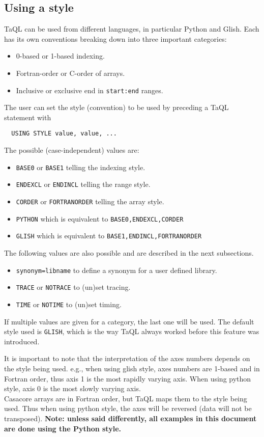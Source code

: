 \subsection{\label{TAQL:USINGSTYLE}Using a style}
TaQL can be used from different languages, in particular Python and
Glish. Each has its own conventions breaking down into three important
categories: 
\begin{itemize}
\item 0-based or 1-based indexing.
\item Fortran-order or C-order of arrays.
\item Inclusive or exclusive end in \texttt{start:end} ranges.
\end{itemize}
The user can set the style (convention) to be used by preceding a
TaQL statement with
\begin{verbatim}
  USING STYLE value, value, ...
\end{verbatim}
The possible (case-independent) values are:
\begin{itemize}
\item \texttt{BASE0} or \texttt{BASE1} telling the indexing style.
\item \texttt{ENDEXCL} or \texttt{ENDINCL} telling the range style.
\item \texttt{CORDER} or \texttt{FORTRANORDER} telling the array style.
\item \texttt{PYTHON} which is equivalent to \texttt{BASE0,ENDEXCL,CORDER}
\item \texttt{GLISH} which is equivalent to \texttt{BASE1,ENDINCL,FORTRANORDER}
\end{itemize}
The following values are also possible and are described in the next subsections.
\begin{itemize}
\item \texttt{synonym=libname} to define a synonym for a user defined
  library.
\item \texttt{TRACE} or \texttt{NOTRACE} to (un)set tracing.
\item \texttt{TIME} or \texttt{NOTIME} to (un)set timing.
\end{itemize}
If multiple values are given for a category, the last one will be used.
The default style used is \texttt{GLISH}, which is the way TaQL always
worked before this feature was introduced.

It is important to note that the interpretation of the axes numbers
depends on the style being used. e.g., when using glish style, axes numbers are
1-based and in Fortran order, thus axis 1 is the most rapidly varying
axis. When using python style, axis 0 is the most slowly varying axis.
\\Casacore arrays are in Fortran order, but TaQL maps them to the
style being used. Thus when using python style, the axes will be
reversed (data will not be transposed).
{\bf Note: unless said differently, all examples in this document are done
using the Python style.} 

